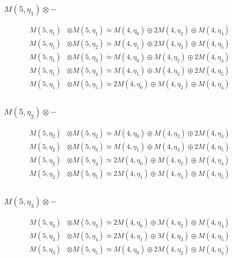 \subsubsection{$ M(5,\eta_{1})\otimes -$}
\begin{align*}
M(5,\eta_{1}) &\otimes M(5,\eta_{1}) \simeq M(4,\eta_{0}) \oplus 2 M(4,\eta_{2}) \oplus M(4,\eta_{4}) \\
M(5,\eta_{1}) &\otimes M(5,\eta_{2}) \simeq M(4,\eta_{1}) \oplus 2 M(4,\eta_{3}) \oplus M(4,\eta_{5}) \\
M(5,\eta_{1}) &\otimes M(5,\eta_{3}) \simeq M(4,\eta_{0}) \oplus M(4,\eta_{2}) \oplus 2 M(4,\eta_{4}) \\
M(5,\eta_{1}) &\otimes M(5,\eta_{4}) \simeq M(4,\eta_{1}) \oplus M(4,\eta_{3}) \oplus 2 M(4,\eta_{5}) \\
M(5,\eta_{1}) &\otimes M(5,\eta_{5}) \simeq 2 M(4,\eta_{0}) \oplus M(4,\eta_{2}) \oplus M(4,\eta_{4}) \\
\end{align*}

\subsubsection{$ M(5,\eta_{2})\otimes -$}
\begin{align*}
M(5,\eta_{2}) &\otimes M(5,\eta_{2}) \simeq M(4,\eta_{0}) \oplus M(4,\eta_{2}) \oplus 2 M(4,\eta_{4}) \\
M(5,\eta_{2}) &\otimes M(5,\eta_{3}) \simeq M(4,\eta_{1}) \oplus M(4,\eta_{3}) \oplus 2 M(4,\eta_{5}) \\
M(5,\eta_{2}) &\otimes M(5,\eta_{4}) \simeq 2 M(4,\eta_{0}) \oplus M(4,\eta_{2}) \oplus M(4,\eta_{4}) \\
M(5,\eta_{2}) &\otimes M(5,\eta_{5}) \simeq 2 M(4,\eta_{1}) \oplus M(4,\eta_{3}) \oplus M(4,\eta_{5}) \\
\end{align*}

\subsubsection{$ M(5,\eta_{3})\otimes -$}
\begin{align*}
M(5,\eta_{3}) &\otimes M(5,\eta_{3}) \simeq 2 M(4,\eta_{0}) \oplus M(4,\eta_{2}) \oplus M(4,\eta_{4}) \\
M(5,\eta_{3}) &\otimes M(5,\eta_{4}) \simeq 2 M(4,\eta_{1}) \oplus M(4,\eta_{3}) \oplus M(4,\eta_{5}) \\
M(5,\eta_{3}) &\otimes M(5,\eta_{5}) \simeq M(4,\eta_{0}) \oplus 2 M(4,\eta_{2}) \oplus M(4,\eta_{4}) \\
\end{align*}

